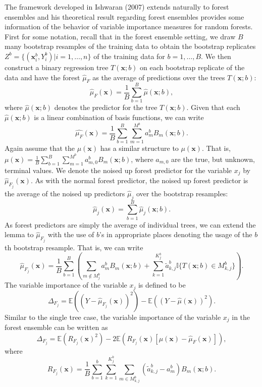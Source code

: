 \documentclass[12pt,twoside]{reedthesis}
\theoremstyle{definition}
\theoremstyle{definition}
\theoremstyle{definition}
\theoremstyle{remark}
\begin{document}
The framework developed in Ishwaran (2007) extends naturally to forest
ensembles and his theoretical result regarding forest ensembles provides
some information of the behavior of variable importance measures for
random forests. First for some notation, recall that in the forest
ensemble setting, we draw \(B\) many bootstrap resamples of the training
data to obtain the bootstrap replicates
\(Z^{b}=\{(\mathbf{x}_i^b, Y_i^b)|i=1,\ldots,n\}\) of the training data
for \(b=1,\ldots, B\). We then construct a binary regression tree
\(T(\mathbf{x};b)\) on each bootstrap replicate of the data and have the
forest \(\hat{\mu}_F\) as the average of predictions over the trees
\(T(\mathbf{x};b)\):
\[\hat{\mu}_F(\mathbf{x})=\frac{1}{B}\sum_{b=1}^B \hat{\mu}(\mathbf{x};b),\]
where \(\hat{\mu}(\mathbf{x};b)\) denotes the predictor for the tree
\(T(\mathbf{x};b)\). Given that each \(\hat{\mu}(\mathbf{x};b)\) is a
linear combination of basis functions, we can write
\[\hat{\mu_F}(\mathbf{x})=\frac{1}{B}\sum_{b=1}^B\sum_{m=1}^{M^b}a_m^b B_m(\mathbf{x};b).\]
Again assume that the \(\mu(\mathbf{x})\) has a similar structure to
\(\mu(\mathbf{x})\). That is,
\(\mu(\mathbf{x})=\frac{1}{B}\sum_{b=1}^B\sum_{m=1}^{M^b}a_{m,0}^b B_m(\mathbf{x};b)\),
where \(a_{m,0}\) are the true, but unknown, terminal values. We denote
the noised up forest predictor for the variable \(x_j\) by
\(\hat{\mu}_{F_j}(\mathbf{x})\). As with the normal forest predictor,
the noised up forest predictor is the average of the noised up
predictors \(\hat{\mu}_j\) over the bootstrap resamples:
\[\hat{\mu}_j(\mathbf{x})=\sum_{b=1}^B \hat{\mu}_j(\mathbf{x};b).\] As
forest predictors are simply the average of individual trees, we can
extend the lemma to \(\hat{\mu}_{F_j}\) with the use of \(b\)'s in
appropriate places denoting the usage of the \(b\)th bootstrap resample.
That is, we can write
\[\hat{\mu}_{F_j}(\mathbf{x})=\frac{1}{B}\sum_{b=1}^B\left(\sum_{m\notin M_j^b} a_m^b B_m(\mathbf{x};b)+\sum_{k=1}^{K_j^b} \tilde{a}_{k,j}^b \mathbb{I}\{T(\mathbf{x};b)\in M_{k,j}^b\} \right).\]
The variable importance of the variable \(x_j\) is defined to be
\[\Delta_{F_j}=\mathbb{E}((Y-\hat{\mu}_{F_j}(\mathbf{x}))^2)-\mathbb{E}((Y-\hat{\mu}(\mathbf{x}))^2).\]
Similar to the single tree case, the variable importance of the variable
\(x_j\) in the forest ensemble can be written as
\[\Delta_{F_j}=\mathbb{E}(R_{F_j}(\mathbf{x})^2)-2\mathbb{E}\left(R_{F_j}(\mathbf{x})[\mu(\mathbf{x})-\hat{\mu}_F(\mathbf{x})]\right),\]
where
\[R_{F_j}(\mathbf{x})=\frac{1}{B}\sum_{b=1}^b\sum_{k=1}^{K_j^b} \sum_{m\in M_{k,j}^b} (\tilde{a}_{k,j}^b-a_m^b)B_m(\mathbf{x}; b).\]
\par
\end{document}
